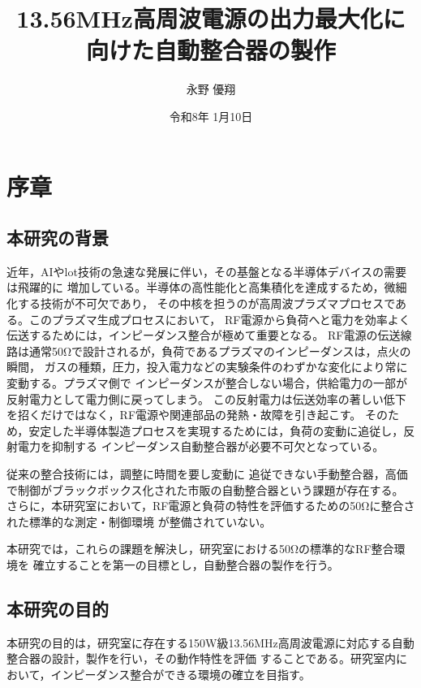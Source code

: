 \documentclass[uplatex, 12pt,oneside,openany]{ujbook}
\title{13.56MHz高周波電源の出力最大化に向けた自動整合器の製作}
\author{永野 優翔}
\date{令和8年 1月10日}
\begin{document}
\maketitle                    %
\cleardoublepageskip          %
\tableofcontents              %
\listoffigures                %
\listoftables                 %
\cleardoublepageskip          %
\newpage

\chapter{序章}

\section{本研究の背景}
 近年，AIやlot技術の急速な発展に伴い，その基盤となる半導体デバイスの需要は飛躍的に
 増加している。半導体の高性能化と高集積化を達成するため，微細化する技術が不可欠であり，
 その中核を担うのが高周波プラズマプロセスである。このプラズマ生成プロセスにおいて，
 RF電源から負荷へと電力を効率よく伝送するためには，インピーダンス整合が極めて重要となる。
 RF電源の伝送線路は通常50Ωで設計されるが，負荷であるプラズマのインピーダンスは，点火の瞬間，
ガスの種類，圧力，投入電力などの実験条件のわずかな変化により常に変動する。プラズマ側で
インピーダンスが整合しない場合，供給電力の一部が反射電力として電力側に戻ってしまう。
この反射電力は伝送効率の著しい低下を招くだけではなく，RF電源や関連部品の発熱・故障を引き起こす。
そのため，安定した半導体製造プロセスを実現するためには，負荷の変動に追従し，反射電力を抑制する
インピーダンス自動整合器が必要不可欠となっている。

従来の整合技術には，調整に時間を要し変動に
追従できない手動整合器，高価で制御がブラックボックス化された市販の自動整合器という課題が存在する。
さらに，本研究室において，RF電源と負荷の特性を評価するための50Ωに整合された標準的な測定・制御環境
が整備されていない。

本研究では，これらの課題を解決し，研究室における50Ωの標準的なRF整合環境を
確立することを第一の目標とし，自動整合器の製作を行う。

\section{本研究の目的}
 本研究の目的は，研究室に存在する150W級13.56MHz高周波電源に対応する自動整合器の設計，製作を行い，その動作特性を評価
 することである。研究室内において，インピーダンス整合ができる環境の確立を目指す。
\end{document}

